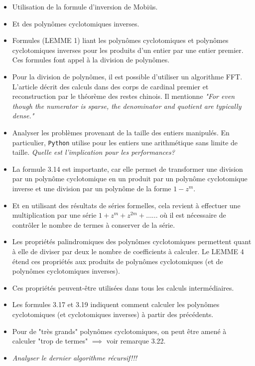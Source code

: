 \documentclass{article}
\theoremstyle{break}                  %
\begin{document}
\begin{itemize}
	\item Utilisation de la formule d'inversion de Mobiüs.
	\item Et des polynômes cyclotomiques inverses.
	\item Formules (LEMME 1) liant les polynômes cyclotomiques et polynômes cyclotomiques inverses pour les produits d'un entier par une entier premier. Ces formules font appel à la division de polynômes.
	\item Pour la division de polynômes, il est possible d'utiliser un algorithme FFT. L'article décrit des calculs dans des corps de cardinal premier et reconstruction par le théorème des restes chinois. Il mentionne \textit{"For even though the numerator is sparse, the denominator and quotient are typically dense."}
	\item Analyser les problèmes provenant de la taille des entiers manipulés. En particulier, \texttt{Python} utilise pour les entiers une arithmétique sans limite de taille. \textit{Quelle est l'implication pour les performances?}
	\item La formule 3.14 est importante, car elle permet de transformer une division par un polynôme cyclotomique en un produit par un polynôme cyclotomique inverse et une division par un polynôme de la forme $1 - z^m$.
	\item Et en utilisant des résultats de séries formelles, cela revient à effectuer une multiplication par une série $1 + z^m + z^{2m} + \dots$... où il est nécessaire de contrôler le nombre de termes à conserver de la série.
	\item Les propriétés palindromiques des polynômes cyclotomiques permettent quant à elle de diviser par deux le nombre de coefficients à calculer. Le LEMME 4 étend ces propriétés aux produits de polynômes cyclotomiques (et de polynômes cyclotomiques inverses).
	\item Ces propriétés peuvent-être utilisées dans tous les calculs intermédiaires.
	\item Les formules 3.17 et 3.19 indiquent comment calculer les polynômes cyclotomiques (et cyclotomiques inverses) à partir des précédents.
	\item Pour de "très grands" polynômes cyclotomiques, on peut être amené à calculer "trop de termes" $\implies$ voir remarque 3.22.
	\item \textit{Analyser le dernier algorithme récursif!!!}
\end{itemize}
\end{document}
